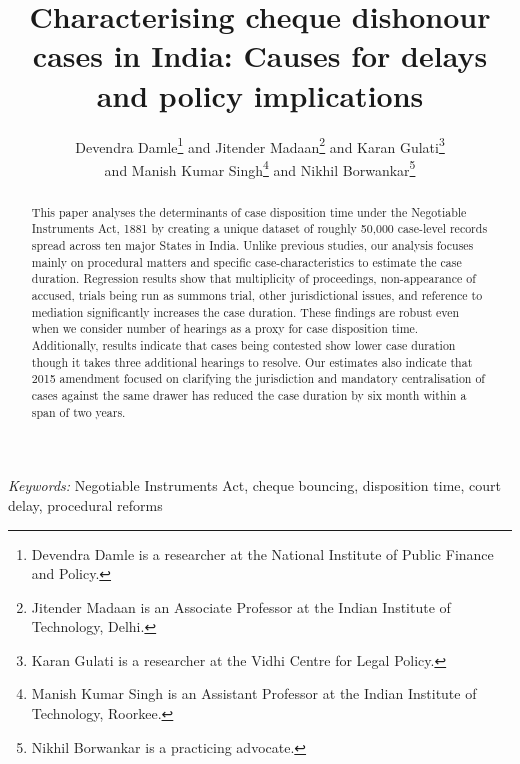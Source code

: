 \documentclass[12pt,a4paper]{article}
\title{Characterising cheque dishonour cases in India: Causes for delays and policy implications}
\author{Devendra Damle\thanks{Devendra Damle is a researcher at the National Institute of Public Finance and Policy.} and Jitender Madaan\thanks{Jitender Madaan is an Associate Professor at the Indian Institute of Technology, Delhi.} and Karan Gulati\thanks{Karan Gulati is a researcher at the Vidhi Centre for Legal Policy.}\\ and Manish Kumar Singh\thanks{Manish Kumar Singh is an Assistant Professor at the Indian Institute of Technology, Roorkee.} and Nikhil Borwankar\thanks{Nikhil Borwankar is a practicing advocate.}}
\begin{document}
\maketitle

\begin{abstract}

This paper analyses the determinants of case disposition time under the Negotiable Instruments Act, 1881 by creating a unique dataset of roughly 50,000 case-level records spread across ten major States in India. Unlike previous studies, our analysis focuses mainly on procedural matters and specific case-characteristics to estimate the case duration. Regression results show that multiplicity of proceedings, non-appearance of accused, trials being run as summons trial, other jurisdictional issues, and reference to mediation significantly increases the case duration. These findings are robust even when we consider number of hearings as a proxy for case disposition time. Additionally, results indicate that cases being contested show lower case duration though it takes three additional hearings to resolve. Our estimates also indicate that 2015 amendment focused on clarifying the jurisdiction and mandatory centralisation of cases against the same drawer has reduced the case duration by six month within a span of two years.

		
		
		

\end{abstract}

\textit{Keywords: } Negotiable Instruments Act, cheque bouncing, disposition time, court delay, procedural reforms
\end{document}
